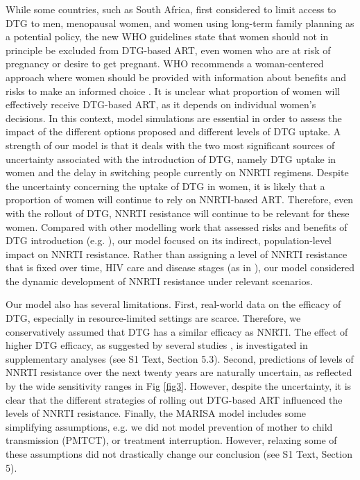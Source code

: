 \documentclass[10pt,letterpaper]{article}
\begin{document}
While some countries, such as South Africa, first considered to limit access to DTG to men, menopausal women, and women using long-term family planning as a potential policy, the new WHO guidelines state that women should not in principle be excluded from DTG-based ART, even women who are at risk of pregnancy or desire to get pregnant. WHO recommends a woman-centered approach where women should be provided with information about benefits and risks to make an informed choice \cite{Milanga2018,WHO2019}. It is unclear what proportion of women will effectively receive DTG-based ART, as it depends on individual women’s decisions. In this context, model simulations are essential in order to assess the impact of the different options proposed and different levels of DTG uptake. A strength of our model is that it deals with the two most significant sources of uncertainty associated with the introduction of DTG, namely DTG uptake in women and the delay in switching people currently on NNRTI regimens. Despite the uncertainty concerning the uptake of DTG in women, it is likely that a proportion of women will continue to rely on NNRTI-based ART. Therefore, even with the rollout of DTG, NNRTI resistance will continue to be relevant for these women. Compared with other modelling work that assessed risks and benefits of DTG introduction (e.g. \cite{Dugdale2019}), our model focused on its indirect, population-level impact on NNRTI resistance. Rather than assigning a level of NNRTI resistance that is fixed over time, HIV care and disease stages (as in \cite{Dugdale2019}), our model considered the dynamic development of NNRTI resistance under relevant scenarios.

Our model also has several limitations. First, real-world data on the efficacy of DTG, especially in resource-limited settings are scarce. Therefore, we conservatively assumed that DTG has a similar efficacy as NNRTI. The effect of higher DTG efficacy, as suggested by several studies \cite{Group2019,Venter2019}, is investigated in supplementary analyses (see S1 Text, Section 5.3). Second, predictions of levels of NNRTI resistance over the next twenty years are naturally uncertain, as reflected by the wide sensitivity ranges in Fig \ref{fig3}. However, despite the uncertainty, it is clear that the different strategies of rolling out DTG-based ART influenced the levels of NNRTI resistance. Finally, the MARISA model includes some simplifying assumptions, e.g. we did not model prevention of mother to child transmission (PMTCT), or treatment interruption. However, relaxing some of these assumptions did not drastically change our conclusion (see S1 Text, Section 5).
\end{document}
